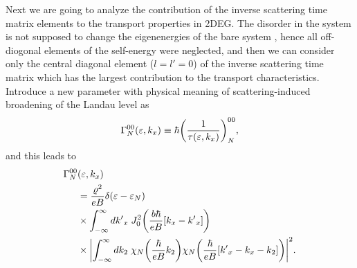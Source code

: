 Next we are going to analyze the contribution of the inverse scattering time matrix elements to the transport properties in 2DEG. The disorder in the system is not supposed to change the eigenenergies of the bare system \cite{wackerl20}, hence all off-diogonal elements of the self-energy were neglected, and then we can consider only the central diagonal element (${l=l'=0}$) of the inverse scattering time matrix which has the largest contribution to the transport characteristics.
Introduce a new parameter with physical meaning of scattering-induced broadening of the Landau level as \cite{dini16,endo09}
\begin{equation} \label{eq_14}
 \Gamma^{00}_{N}(\varepsilon,k_x) \equiv \hbar \qty(\frac{1}{\tau(\varepsilon,k_x)})^{00}_{N},
\end{equation}
and this leads to
\begin{equation} \label{eq_15}
 \begin{aligned}
   \Gamma^{00}_{N}& (\varepsilon,k_x) \\
   & =
   \frac { \varrho^2}{eB}
   \delta(\varepsilon - \varepsilon_{N}) \\
   & \times
   \int_{-\infty}^{\infty} d {k'}_x \;
   J_0^2\qty(\frac{b\hbar}{eB}[{k}_x - {k'}_x])
   \\
   & \times
   \qty|
   \int_{-\infty}^{\infty} dk_2 \;
   {\chi}_{N}\qty(\frac{\hbar}{eB}k_2)
   {\chi}_{N}\qty(\frac{\hbar}{eB} \qty[{k'}_x - {k}_x - k_2])|^2.
 \end{aligned}
\end{equation}

